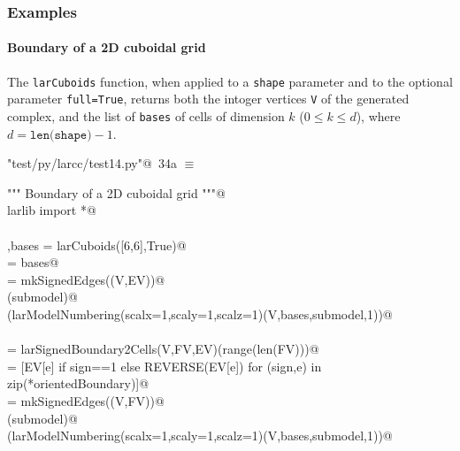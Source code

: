 \documentclass[11pt,oneside]{article}    %
\begin{document}
\subsubsection{Examples}

\paragraph{Boundary of a 2D cuboidal grid}
The \texttt{larCuboids} function, when applied to a \texttt{shape} parameter and to the optional parameter \texttt{full=True}, returns both the intoger vertices \texttt{V} of the generated complex, and the list of \texttt{bases} of cells of dimension $k$ ($0\leq k\leq d$), where $d = \texttt{len(shape)}-1$.

\begin{flushleft} \small \label{scrap55}
\protect{}\verb@"test/py/larcc/test14.py"@\nobreak\ {\footnotesize 34a }$\equiv$
\vspace{-1ex}
\begin{list}{}{} \item
\mbox{}\verb@""" Boundary of a 2D cuboidal grid """@\\
\mbox{}\verb@from larlib import *@\\
\mbox{}\verb@@\\
\mbox{}\verb@V,bases = larCuboids([6,6],True)@\\
\mbox{}\verb@[VV,EV,FV] = bases@\\
\mbox{}\verb@submodel = mkSignedEdges((V,EV))@\\
\mbox{}\verb@VIEW(submodel)@\\
\mbox{}\verb@VIEW(larModelNumbering(scalx=1,scaly=1,scalz=1)(V,bases,submodel,1))@\\
\mbox{}\verb@@\\
\mbox{}\verb@orientedBoundary = larSignedBoundary2Cells(V,FV,EV)(range(len(FV)))@\\
\mbox{}\verb@FV = [EV[e] if sign==1 else REVERSE(EV[e])  for (sign,e) in zip(*orientedBoundary)]@\\
\mbox{}\verb@submodel = mkSignedEdges((V,FV))@\\
\mbox{}\verb@VIEW(submodel)@\\
\mbox{}\verb@VIEW(larModelNumbering(scalx=1,scaly=1,scalz=1)(V,bases,submodel,1))@\\
\mbox{}\verb@@{\NWsep}
\end{list}
\vspace{-2ex}
\end{flushleft}
\end{document}
